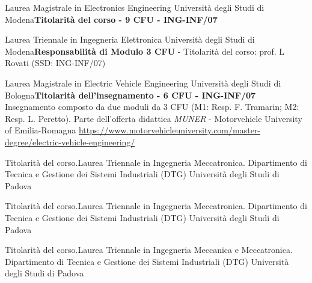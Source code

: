 {
{Laurea Magistrale in Electronics Engineering}
{Università degli Studi di Modena}{\newline \textbf{Titolarità del corso - 9 CFU - ING-INF/07}}{}

{\newline Laurea Triennale in Ingegneria Elettronica}
{Università degli Studi di Modena}{\newline \textbf{Responsabilità di Modulo 3 CFU} - Titolarità del corso: prof. L Rovati (SSD: ING-INF/07)}{}

{Laurea Magistrale in Electric Vehicle Engineering}
{Università degli Studi di Bologna}{\newline \textbf{Titolarità dell'insegnamento - 6 CFU - ING-INF/07}}{
    Insegnamento composto da due moduli da 3 CFU (M1: Resp. F. Tramarin; M2: Resp. L. Peretto).\newline
    Parte dell'offerta didattica \textit{MUNER} - Motorvehicle University of Emilia-Romagna \newline \href{https://www.motorvehicleuniversity.com/master-degree/electric-vehicle-engineering/}{https://www.motorvehicleuniversity.com/master-degree/electric-vehicle-engineering/}}

{Titolarità del corso.\newline Laurea Triennale in Ingegneria Meccatronica.\newline
Dipartimento di Tecnica e Gestione dei Sistemi Industriali (DTG)}
{Università degli Studi di Padova}{}{}

{Titolarità del corso.\newline Laurea Triennale in Ingegneria Meccatronica.\newline
Dipartimento di Tecnica e Gestione dei Sistemi Industriali (DTG)}
{Università degli Studi di Padova}{}{}


{Titolarità del corso.\newline Laurea Triennale in Ingegneria Meccanica e Meccatronica.\newline
Dipartimento di Tecnica e Gestione dei Sistemi Industriali (DTG)}
{Università degli Studi di Padova}{}{}

}
